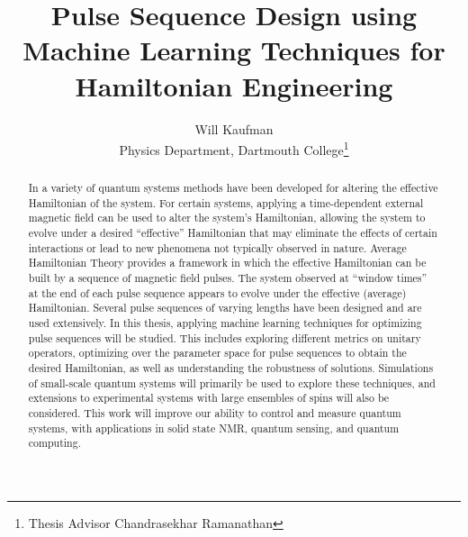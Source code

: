 \documentclass{article}
\title{Pulse Sequence Design using Machine Learning Techniques for Hamiltonian Engineering}
\author{Will Kaufman \\ Physics Department, Dartmouth College\thanks{Thesis Advisor Chandrasekhar Ramanathan}}
\begin{document}
\maketitle

\begin{abstract}




%
%
%

In a variety of quantum systems methods have been developed for altering the effective Hamiltonian of the system.
For certain systems,
applying a time-dependent external magnetic field can be used to alter the system's Hamiltonian, allowing the system to evolve under a desired ``effective'' Hamiltonian that may eliminate the effects of certain interactions or lead to new phenomena not typically observed in nature. Average Hamiltonian Theory provides a framework in which the effective Hamiltonian can be built by a sequence of magnetic field pulses. The system observed at ``window times'' at the end of each pulse sequence appears to evolve under the effective (average) Hamiltonian. Several pulse sequences of varying lengths have been designed and are used extensively.
In this thesis, applying machine learning techniques for optimizing pulse sequences will be studied. This includes exploring different metrics on unitary operators, optimizing over the parameter space for pulse sequences to obtain the desired Hamiltonian, as well as understanding the robustness of solutions. Simulations of small-scale quantum systems will primarily be used to explore these techniques, and extensions to experimental systems with large ensembles of spins will also be considered.
This work will improve our ability to control and measure quantum systems, with applications in solid state NMR, quantum sensing, and quantum computing.

\end{abstract}
\end{document}
